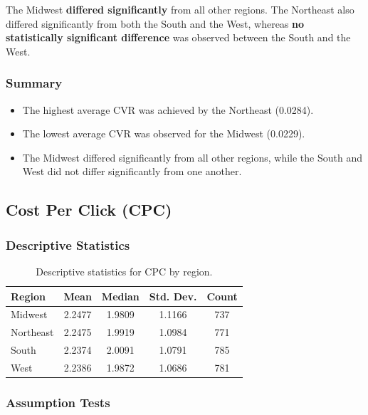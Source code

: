 The Midwest \textbf{differed significantly} from all other regions. The Northeast also differed significantly from both the South and the West, whereas \textbf{no statistically significant difference} was observed between the South and the West.

\subsubsection{Summary}

\begin{itemize}
	\item The highest average CVR was achieved by the Northeast (0.0284).
	\item The lowest average CVR was observed for the Midwest (0.0229).
	\item The Midwest differed significantly from all other regions, while the South and West did not differ significantly from one another.
\end{itemize}

\subsection{Cost Per Click (CPC)}\label{appendix:regional_performance_analysis_CPC}

\subsubsection{Descriptive Statistics}

\begin{table}[H]
	\centering
	\caption{Descriptive statistics for CPC by region.}
	\begin{tabular}{lcccc}
		\toprule
		Region & Mean & Median & Std. Dev. & Count \\
		\midrule
		Midwest & 2.2477 & 1.9809 & 1.1166 & 737 \\
		Northeast & 2.2475 & 1.9919 & 1.0984 & 771 \\
		South & 2.2374 & 2.0091 & 1.0791 & 785 \\
		West & 2.2386 & 1.9872 & 1.0686 & 781 \\
		\bottomrule
	\end{tabular}
\end{table}

\subsubsection{Assumption Tests}

